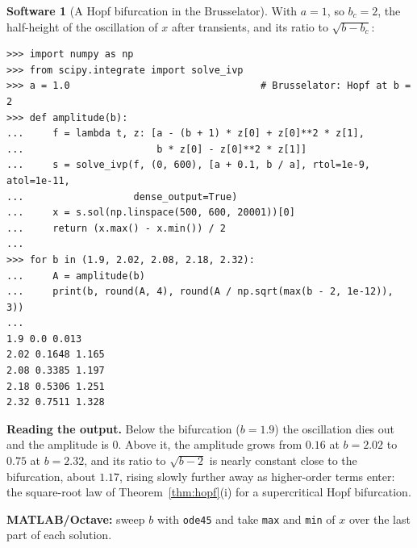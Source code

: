 \documentclass[11pt,a4paper]{article}
\numberwithin{equation}{section}
\theoremstyle{definition}
\newtheorem{software}[thm]{Software}
\begin{document}
\begin{software}[A Hopf bifurcation in the Brusselator]
\label{sw:hopf}
With $a = 1$, so $b_c = 2$, the half-height of the oscillation of $x$ after transients, and its ratio to $\sqrt{b - b_c}$:
{\small\begin{verbatim}
>>> import numpy as np
>>> from scipy.integrate import solve_ivp
>>> a = 1.0                                 # Brusselator: Hopf at b = 2
>>> def amplitude(b):
...     f = lambda t, z: [a - (b + 1) * z[0] + z[0]**2 * z[1],
...                       b * z[0] - z[0]**2 * z[1]]
...     s = solve_ivp(f, (0, 600), [a + 0.1, b / a], rtol=1e-9, atol=1e-11,
...                   dense_output=True)
...     x = s.sol(np.linspace(500, 600, 20001))[0]
...     return (x.max() - x.min()) / 2
...
>>> for b in (1.9, 2.02, 2.08, 2.18, 2.32):
...     A = amplitude(b)
...     print(b, round(A, 4), round(A / np.sqrt(max(b - 2, 1e-12)), 3))
...
1.9 0.0 0.013
2.02 0.1648 1.165
2.08 0.3385 1.197
2.18 0.5306 1.251
2.32 0.7511 1.328
\end{verbatim}}
\textbf{Reading the output.} Below the bifurcation ($b = 1.9$) the oscillation dies out and the amplitude is $0$. Above it, the amplitude grows from $0.16$ at $b = 2.02$ to $0.75$ at $b = 2.32$, and its ratio to $\sqrt{b - 2}$ is
nearly constant close to the bifurcation, about $1.17$, rising slowly further away as higher-order terms enter: the square-root law of Theorem~\ref{thm:hopf}(i) for a supercritical Hopf bifurcation.

\textbf{MATLAB/Octave:} sweep $b$ with \texttt{ode45} and take \texttt{max} and \texttt{min} of $x$ over the last part of each solution.
\end{software}
\end{document}
